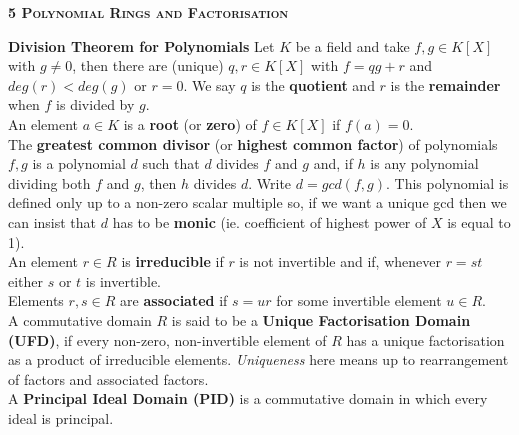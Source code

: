 \documentclass[a4paper]{article}
\begin{document}
\newpage
\begin{framed}
	\begin{center}
		\textbf{\textsc{5 Polynomial Rings and Factorisation}}
	\end{center}
	\textbf{Division Theorem for Polynomials} Let $K$ be a field and take $f, g \in K[X]$ with $g \neq 0$, then there are (unique) $q, r \in K[X]$ with $f = qg + r$ and $deg(r) < deg(g)$ or $r = 0$. We say $q$ is the \textbf{quotient} and $r$ is the \textbf{remainder} when $f$ is divided by $g$.\\
	
	\noindent
	An element $a \in K$ is a \textbf{root} (or \textbf{zero}) of $f \in K[X]$ if $f(a) = 0$.\\
	
	\noindent
	The \textbf{greatest common divisor} (or \textbf{highest common factor}) of polynomials $f, g$ is a polynomial $d$ such that $d$ divides $f$ and $g$ and, if $h$ is any polynomial dividing both $f$ and $g$, then $h$ divides $d$. Write $d = gcd(f, g)$. This polynomial is defined only up to a non-zero scalar multiple so, if we want a unique gcd then we can insist that $d$ has to be \textbf{monic} (ie. coefficient of highest power of $X$ is equal to 1).\\
	
	\noindent
	An element $r \in R$ is \textbf{irreducible} if $r$ is not invertible and if, whenever $r = st$ either $s$ or $t$ is invertible.\\
	
	\noindent
	Elements $r, s \in R$ are \textbf{associated} if $s = ur$ for some invertible element $u \in R$.\\
	
	\noindent
	A commutative domain $R$ is said to be a \textbf{Unique Factorisation Domain (UFD)}, if every non-zero, non-invertible element of $R$ has a unique factorisation as a product of irreducible elements. \textit{Uniqueness} here means up to rearrangement of factors and associated factors.\\
	
	\noindent
	A \textbf{Principal Ideal Domain (PID)} is a commutative domain in which every ideal is principal.
\end{framed}
\end{document}
